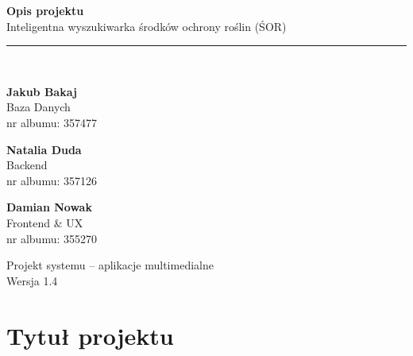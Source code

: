 \documentclass[11pt,a4paper]{article}
\begin{document}
\hypersetup{pageanchor=false}
\begin{titlepage}
    \centering
    \vspace*{2.5cm}
    
    {\Huge\bfseries\color{green} Opis projektu}\\[1cm]
    {\huge Inteligentna wyszukiwarka środków ochrony roślin (ŚOR)}\\[1.5cm]
    
    {\color{green}\rule{0.6\linewidth}{1pt}}\\[1.5cm]
    
    \begin{minipage}{0.31\textwidth}
        \centering
        {\large\textbf{Jakub Bakaj}}\\[0.2em]
        {\small Baza Danych}\\[0.2em]
        {\footnotesize\color{gray} nr albumu: 357477}
    \end{minipage}
    \hfill
    \begin{minipage}{0.31\textwidth}
        \centering
        {\large\textbf{Natalia Duda}}\\[0.2em]
        {\small Backend}\\[0.2em]
        {\footnotesize\color{gray} nr albumu: 357126}
    \end{minipage}
    \hfill
    \begin{minipage}{0.31\textwidth}
        \centering
        {\large\textbf{Damian Nowak}}\\[0.2em]
        {\small Frontend \& UX}\\[0.2em]
        {\footnotesize\color{gray} nr albumu: 355270}
    \end{minipage}
    
    \vfill
    
    {\large Projekt systemu -- aplikacje multimedialne}\\[0.3em]
    {\small Wersja 1.4}
    \vspace*{1cm}
\end{titlepage}


\newpage
\hypersetup{pageanchor=true}

\section{Tytuł projektu}
\end{document}
